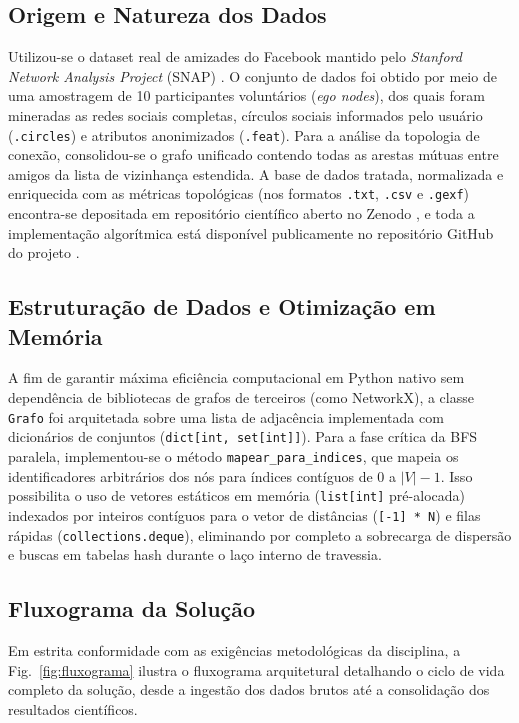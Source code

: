 \documentclass[conference]{IEEEtran}
\begin{document}
\subsection{Origem e Natureza dos Dados}
Utilizou-se o dataset real de amizades do Facebook mantido pelo \textit{Stanford Network Analysis Project} (SNAP) \cite{snapfacebook,mcauley2012learning}. O conjunto de dados foi obtido por meio de uma amostragem de 10 participantes voluntários (\textit{ego nodes}), dos quais foram mineradas as redes sociais completas, círculos sociais informados pelo usuário (\texttt{.circles}) e atributos anonimizados (\texttt{.feat}). Para a análise da topologia de conexão, consolidou-se o grafo unificado contendo todas as arestas mútuas entre amigos da lista de vizinhança estendida. A base de dados tratada, normalizada e enriquecida com as métricas topológicas (nos formatos \texttt{.txt}, \texttt{.csv} e \texttt{.gexf}) encontra-se depositada em repositório científico aberto no Zenodo \cite{dataset_zenodo}, e toda a implementação algorítmica está disponível publicamente no repositório GitHub do projeto \cite{repositorio_projeto}.

\subsection{Estruturação de Dados e Otimização em Memória}
A fim de garantir máxima eficiência computacional em Python nativo sem dependência de bibliotecas de grafos de terceiros (como NetworkX), a classe \texttt{Grafo} foi arquitetada sobre uma lista de adjacência implementada com dicionários de conjuntos (\texttt{dict[int, set[int]]}). Para a fase crítica da BFS paralela, implementou-se o método \texttt{mapear\_para\_indices}, que mapeia os identificadores arbitrários dos nós para índices contíguos de $0$ a $|V|-1$. Isso possibilita o uso de vetores estáticos em memória (\texttt{list[int]} pré-alocada) indexados por inteiros contíguos para o vetor de distâncias (\texttt{[-1] * N}) e filas rápidas (\texttt{collections.deque}), eliminando por completo a sobrecarga de dispersão e buscas em tabelas hash durante o laço interno de travessia.

\subsection{Fluxograma da Solução}
Em estrita conformidade com as exigências metodológicas da disciplina, a Fig.~\ref{fig:fluxograma} ilustra o fluxograma arquitetural detalhando o ciclo de vida completo da solução, desde a ingestão dos dados brutos até a consolidação dos resultados científicos.
\end{document}
